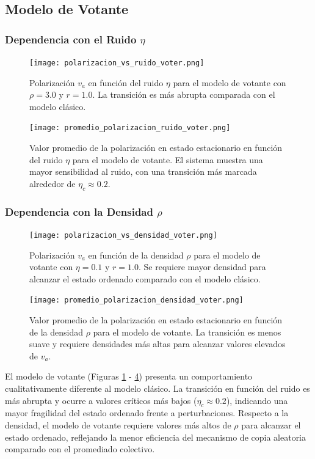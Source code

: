 \documentclass{article}
\begin{document}
\subsection{Modelo de Votante}

\subsubsection{Dependencia con el Ruido $\eta$}
\begin{figure}[H]
\centering
\texttt{[image: polarizacion\_vs\_ruido\_voter.png]}
\caption{Polarización $v_a$ en función del ruido $\eta$ para el modelo de votante con $\rho = 3.0$ y $r = 1.0$. La transición es más abrupta comparada con el modelo clásico.}
\label{fig:va_vs_eta_voter}
\end{figure}

\begin{figure}[H]
\centering
\texttt{[image: promedio\_polarizacion\_ruido\_voter.png]}
\caption{Valor promedio de la polarización en estado estacionario en función del ruido $\eta$ para el modelo de votante. El sistema muestra una mayor sensibilidad al ruido, con una transición más marcada alrededor de $\eta_c \approx 0.2$.}
\label{fig:promedio_va_eta_voter}
\end{figure}

\subsubsection{Dependencia con la Densidad $\rho$}
\begin{figure}[H]
\centering
\texttt{[image: polarizacion\_vs\_densidad\_voter.png]}
\caption{Polarización $v_a$ en función de la densidad $\rho$ para el modelo de votante con $\eta = 0.1$ y $r = 1.0$. Se requiere mayor densidad para alcanzar el estado ordenado comparado con el modelo clásico.}
\label{fig:va_vs_rho_voter}
\end{figure}

\begin{figure}[H]
\centering
\texttt{[image: promedio\_polarizacion\_densidad\_voter.png]}
\caption{Valor promedio de la polarización en estado estacionario en función de la densidad $\rho$ para el modelo de votante. La transición es menos suave y requiere densidades más altas para alcanzar valores elevados de $v_a$.}
\label{fig:promedio_va_rho_voter}
\end{figure}

El modelo de votante (Figuras \ref{fig:va_vs_eta_voter} - \ref{fig:promedio_va_rho_voter}) presenta un comportamiento cualitativamente diferente al modelo clásico. La transición en función del ruido es más abrupta y ocurre a valores críticos más bajos ($\eta_c \approx 0.2$), indicando una mayor fragilidad del estado ordenado frente a perturbaciones. Respecto a la densidad, el modelo de votante requiere valores más altos de $\rho$ para alcanzar el estado ordenado, reflejando la menor eficiencia del mecanismo de copia aleatoria comparado con el promediado colectivo.
\end{document}
